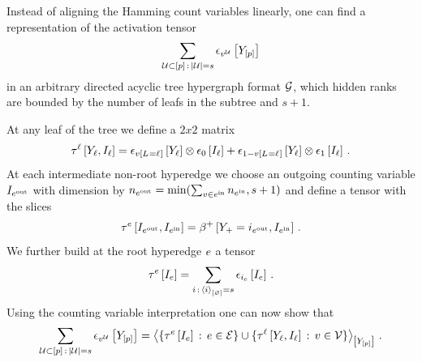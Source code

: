 \begin{example}
    Instead of aligning the Hamming count variables linearly, one can find a representation of the activation tensor
    \begin{align*}
        \sum_{\mathcal{U}\subset[p] \,:\, \left|\mathcal{U}\right|=s} \epsilon_{v^{\mathcal{U}}}\left[Y_{[p]}\right]
    \end{align*}
    in an arbitrary directed acyclic tree hypergraph format $\mathcal{G}$, which hidden ranks are bounded by the number of leafs in the subtree and $s+1$.

    At any leaf of the tree we define a $2x2$ matrix
    \begin{align*}
        \tau^{\ell}\left[Y_{\ell},I_{\ell}\right]
        = \epsilon_{v\left[L_{}=\ell_{}\right]}\left[Y_{\ell}\right] \otimes \epsilon_{0}\left[I_{\ell}\right]
        + \epsilon_{1-v\left[L_{}=\ell_{}\right]}\left[Y_{\ell}\right] \otimes \epsilon_{1}\left[I_{\ell}\right] \, .
    \end{align*}
    At each intermediate non-root hyperedge we choose an outgoing counting variable $I_{e^{\mathrm{out}}}$ with dimension by $n_{e^{\mathrm{out}}}=\min(\sum_{v\in e^{\mathrm{in}}}n_{e^{\mathrm{in}}},s+1)$ and define a tensor with the slices
    \begin{align*}
        \hypercoreofat{\edge}{\decvariableof{\outgoingnodes},\decvariableof{\incomingnodes}}
        = \bencodingofat{+}{\headvariableof{+}=\decindexof{\outgoingnodes},\decvariableof{\incomingnodes}} \, .
    \end{align*}
    We further build at the root hyperedge $e$ a tensor
    \begin{align*}
        \tau^{e}\left[I_{e}\right]
        = \sum_{i \,:\, \left\langle i\right\rangle_{\left[ \varnothing \right]}=s}
        \epsilon_{i_{e}}\left[I_{e}\right] \, .
    \end{align*}
    Using the counting variable interpretation one can now show that
    \begin{align*}
        \sum_{\mathcal{U}\subset[p] \,:\, \left|\mathcal{U}\right|=s} \epsilon_{v^{\mathcal{U}}}\left[Y_{[p]}\right]
        =\left\langle 
        \{\tau^{e}\left[I_{e}\right] \,:\, e\in\mathcal{E} \} \cup \{\tau^{\ell}\left[Y_{\ell},I_{\ell}\right] \,:\, v\in\mathcal{V}\}
        \right\rangle_{\left[ Y_{[p]} \right]} \, .
    \end{align*}
\end{example}